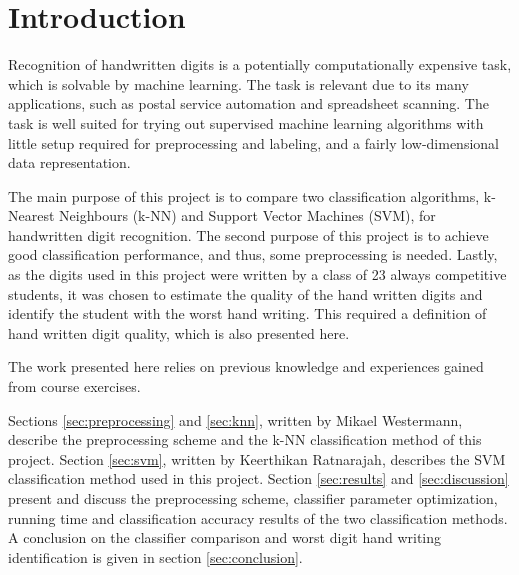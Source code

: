 \section{Introduction}
Recognition of handwritten digits is a potentially computationally expensive
task, which is solvable by machine learning. The task is
relevant due to its many applications, such as
postal service automation
and
spreadsheet scanning.
The task is well suited for trying out supervised machine learning algorithms
with little setup required for preprocessing and labeling,
and a fairly low-dimensional data representation.

The main purpose of this project is to compare two classification algorithms,
k-Nearest Neighbours (k-NN) and Support Vector Machines (SVM),
for handwritten digit recognition.
The second purpose of this project is to achieve good classification performance,
and thus, some preprocessing is needed.
Lastly, as the digits used in this project
were written by a class of 23 always competitive students,
it was chosen to estimate the quality of the hand written digits
and identify the student with the worst hand writing.
This required a definition of hand written digit quality,
which is also presented here.

The work presented here relies on previous knowledge
and experiences gained from course exercises.

Sections \ref{sec:preprocessing} and \ref{sec:knn},
written by Mikael Westermann,
describe the preprocessing scheme and the k-NN
classification method of this project.
Section \ref{sec:svm}, written by Keerthikan Ratnarajah,
describes the SVM classification method used in this project.
Section \ref{sec:results} and \ref{sec:discussion}
present and discuss the preprocessing scheme,
classifier parameter optimization,
running time and classification accuracy results
of the two classification methods.
A conclusion on the classifier comparison
and worst digit hand writing identification
is given in section \ref{sec:conclusion}.
